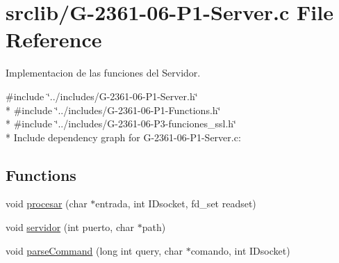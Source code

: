 \hypertarget{_g-2361-06-_p1-_server_8c}{}\section{srclib/\+G-\/2361-\/06-\/\+P1-\/\+Server.c File Reference}
\label{_g-2361-06-_p1-_server_8c}


Implementacion de las funciones del Servidor.  


{\ttfamily \#include \char`\"{}../includes/\+G-\/2361-\/06-\/\+P1-\/\+Server.\+h\char`\"{}}\\*
{\ttfamily \#include \char`\"{}../includes/\+G-\/2361-\/06-\/\+P1-\/\+Functions.\+h\char`\"{}}\\*
{\ttfamily \#include \char`\"{}../includes/\+G-\/2361-\/06-\/\+P3-\/funciones\+\_\+ssl.\+h\char`\"{}}\\*
Include dependency graph for G-\/2361-\/06-\/\+P1-\/\+Server.c\+:
\subsection*{Functions}
\begin{DoxyCompactItemize}
\item 
void \hyperlink{_g-2361-06-_p1-_server_8c_a3053755c82b5168bea9d848b1284f3ca}{procesar} (char $\ast$entrada, int I\+Dsocket, fd\+\_\+set readset)
\item 
void \hyperlink{_g-2361-06-_p1-_server_8c_ae168ee6fdf31fd5ed7d49d45b89a65ed}{servidor} (int puerto, char $\ast$path)
\item 
void \hyperlink{_g-2361-06-_p1-_server_8c_ab7e145be74e8922987621cd01b8d446e}{parse\+Command} (long int query, char $\ast$comando, int I\+Dsocket)
\end{DoxyCompactItemize}
